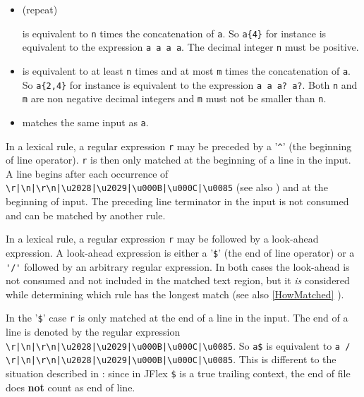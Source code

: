 \documentclass[11pt]{scrartcl}
\newcommand{\bl}{\latex{\symbol{123}}\html{\{}}
\newcommand{\br}{\latex{\symbol{125}}\html{\}}}
\newcommand{\trit}{\em}
\begin{document}
\begin{itemize}
          \item[\texttt{a\bl n\br}] (repeat)          

            is equivalent to \texttt{n} times the concatenation of \texttt{a}.
            So \verb+a{4}+ for instance is equivalent to the expression \texttt{a a a a}.
            The decimal integer \texttt{n} must be positive.          
          
          \item[\texttt{a\bl n,m\br}]          
            is equivalent to at least \texttt{n} times and at most \texttt{m} times the 
            concatenation of \texttt{a}. So \verb+a{2,4}+ for instance is equivalent 
            to the expression \verb+a a a? a?+. Both \texttt{n} and \texttt{m} are non
            negative decimal integers and \texttt{m} must not be smaller than \texttt{n}.
          
          \item[\texttt{( a )}]
            matches the same input as \texttt{a}.
            
        
\end{itemize}
    
In a lexical rule, a regular expression \texttt{r} may be preceded by a
'\verb+^+' (the beginning of line operator). \texttt{r} is then
only matched at the beginning of a line in the input. A line begins
after each occurrence of \verb+\r|\n|\r\n|\u2028|\u2029|\u000B|\u000C|\u0085+ 
(see also \cite{unicode_rep}) and at the beginning of input.  
The preceding line terminator in the input is not consumed and can 
be matched by another rule.

In a lexical rule, a regular expression \texttt{r} may be followed by a
look-ahead expression. A look-ahead expression is either a '\texttt{\$}'
(the end of line operator) or a \verb+'/'+ followed by an arbitrary
regular expression. In both cases the look-ahead is not consumed and
not included in the matched text region, but it {\trit is} considered
while determining which rule has the longest match (see also 
\ref{HowMatched} ). 

In the '\texttt{\$}' case \texttt{r} is only matched at the end of a line in
the input. The end of a line is denoted by the regular expression
\verb+\r|\n|\r\n|\u2028|\u2029|\u000B|\u000C|\u0085+. 
So \verb+a$+ is equivalent to \verb+a / \r|\n|\r\n|\u2028|\u2029|\u000B|\u000C|\u0085+.
This is different to the situation described in \cite{unicode_rep}:
since in JFlex \verb+$+ is a true trailing context, the end of file
does {\bf not} count as end of line.
\end{document}
